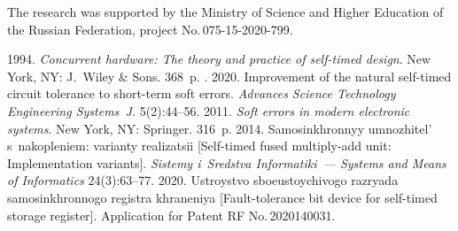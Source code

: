 \vspace*{-15pt}

  \Ack
  
  \vspace*{-3pt}
  
  \noindent
  The research was supported by the Ministry of Science and Higher Education of the Russian Federation, 
project No.\,075-15-2020-799.

\vspace*{6pt}

  \begin{multicols}{2}

\renewcommand{\bibname}{\protect\rmfamily References}

{\small\frenchspacing
 {%
 \begin{thebibliography}{9}
  
  
   1994. \textit{Concurrent 
hardware: The theory and practice of self-timed design}. New York, NY: J.~Wiley \& Sons. 368~p.
  . 2020. Improvement of the natural self-timed circuit tolerance to short-term soft 
errors. \textit{Advances Science Technology Engineering Systems~J.} 5(2):44--56.
   2011. \textit{Soft errors in modern electronic systems}. New York, NY: 
Springer. 316~p.
   2014. Samosinkhronnyy umnozhitel' s~nakopleniem: varianty 
realizatsii [Self-timed fused multiply-add unit: Implementation variants]. \textit{Sistemy i~Sredstva 
Informatiki~--- Systems and Means of Informatics} 24(3):63--77.
   2020. 
Ustroystvo sboeustoychivogo razryada samosinkhronnogo registra khraneniya [Fault-tolerance bit device 
for self-timed storage register]. Application for Patent RF No.\,2020140031.
\end{thebibliography}

 }
 }

\end{multicols}

\vspace*{-3pt}

